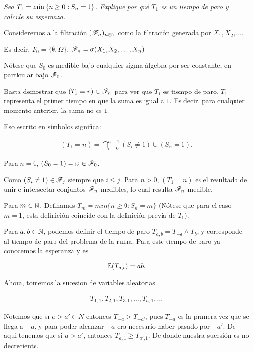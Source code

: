 \emph
{
	Sea $T_1=\min\left\{ n\geq 0:S_n=1\right\} $. Explique por qu\'e $T_1$ es un 
	tiempo de paro y calcule su esperanza.
}

\afterstatement\pn

	Consideremos a la filtración $(\mathscr{F}_n)_{n\in\mathbb{N}}$ como la filtración 
	generada por $X_1, X_2, \dots$.\pn

	Es decir, $F_0 = \{\emptyset, \Omega\}$, $\mathscr{F}_n = \sigma(X_1, X_2, \dots, X_n)$\pn

	Nótese que $S_0$ es medible bajo cualquier sigma álgebra por ser constante, en particular bajo
	$\mathscr{F}_0$.\pn

	Basta demostrar que $(T_1 = n) \in \mathscr{F}_n$ para ver que $T_1$ es tiempo de paro. $T_1$ 
	representa el primer tiempo en que la suma es igual a $1$. Es decir, para cualquier 
	momento anterior, la suma no es $1$.\pn

	Eso escrito en símbolos significa:

    \begin{align}
        (T_1 = n) = \bigcap_{i=0}^{n-1}(S_i \not= 1) \cup (S_n = 1).
    \end{align}\pn

	Para $n=0$, $(S_0 = 1) = \omega \in \mathscr{F}_0$.\pn

	Como $(S_i \not= 1) \in \mathscr{F}_j$ siempre que $i \leq j$. Para $n>0$, $(T_1 = n)$ es el resultado de 
	unir e intersectar conjuntos $\mathscr{F}_n$-medibles, lo cual resulta $\mathscr{F}_n$-medible.\pn

	Para $m \in \mathbb{N}$. Definamos $T_m = min\{n \geq 0 : S_n = m\}$ 
	(Nótese que para el caso $m=1$, esta definición	coincide con la definición previa de $T_1$).\pn
	
	Para $a,b \in \mathbb{N}$, podemos definir el tiempo de paro $T_{a,b} = T_{-a} \wedge T_b$, y 
	corresponde al 	tiempo de paro del problema de la ruina. Para este tiempo de paro ya conocemos 
	la esperanza y es
	
    \begin{align}
        \mathbb{E}(T_{a,b}) = ab.
    \end{align}\pn
	
	Ahora, tomemos la sucesion de variables aleatorias
    
    \begin{align}
        T_{1,1}, T_{2,1}, T_{3,1}, \dots, T_{n,1},\dots
    \end{align}\pn 
    
    Notemos que si $a>a' \in N$ entonces $T_{-a} > T_{-a'}$, pues $T_{-a}$ es la primera vez
	que se llega a $-a$, y para poder alcanzar $-a$ era necesario haber pasado por $-a'$.
	De aqui tenemos que si $a>a'$, entonces $T_{a,1} \geq T_{a',1}$. De donde nuestra sucesión es 
	no decreciente.\pn
	
